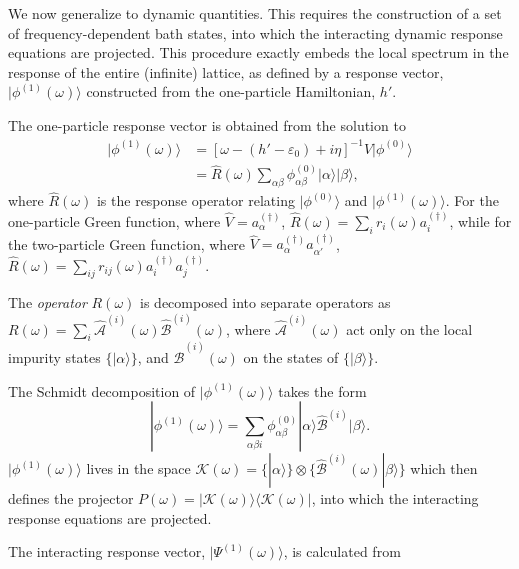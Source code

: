 \documentclass[aps,twocolumn,nobibnotes]{revtex4}
\begin{document}
We now generalize to dynamic quantities. This requires the construction of a set of frequency-dependent bath states, into which the
interacting dynamic response equations are projected. This procedure exactly embeds the local spectrum in the response of the entire (infinite) lattice, 
as defined by a response vector, $|\phi^{(1)}(\omega) \rangle$ constructed from the one-particle Hamiltonian, $h'$.
\begin{inparaenum}
\item The one-particle response vector is obtained from the solution to
\begin{align}
|\phi^{(1)}(\omega) \rangle &= \left[ \omega-(h'-\varepsilon_0)+i\eta \right]^{-1} {\hat V} |\phi^{(0)}\rangle  \nonumber \\ 
                            &= {\hat R}(\omega) \sum_{\alpha \beta} \phi^{(0)}_{\alpha \beta} |\alpha \rangle |\beta \rangle    ,
\end{align}
where ${\hat R}(\omega)$ is the response operator relating $| \phi^{(0)} \rangle$ and $| \phi^{(1)}(\omega) \rangle$. For the one-particle Green 
function, where ${\hat V} = a_{\alpha}^{(\dagger)}$, ${\hat R}(\omega) = \sum_i r_i(\omega) a_i^{(\dagger)}$, while for the two-particle Green function, 
where ${\hat V}=a_{\alpha}^{(\dagger)} a_{\alpha'}^{(\dagger)}$, ${\hat R}(\omega) = \sum_{ij} r_{ij}(\omega) a_i^{(\dagger)} a_j^{(\dagger)}$.
\item The {\em operator} $R(\omega)$ is decomposed into separate operators as $R(\omega) = \sum_i {\hat {\mathcal{A}}}^{(i)}(\omega) {\hat {\mathcal{B}}}^{(i)}(\omega)$, 
where ${\hat {\mathcal{A}}}^{(i)}(\omega)$ act only on the local impurity states $\{ |\alpha \rangle \}$, and ${\hat {\mathcal{B}}}^{(i)}(\omega)$ on the states of $\{ |\beta\rangle \}$.
\item The Schmidt decomposition of $| \phi^{(1)}(\omega) \rangle$ takes the form
\begin{equation}
|\phi^{(1)}(\omega) \rangle = \sum_{\alpha \beta i} \phi^{(0)}_{\alpha \beta} |\alpha \rangle {\hat {\mathcal{B}}}^{(i)} |\beta \rangle .
\end{equation}
$| \phi^{(1)}(\omega) \rangle$ lives in the space $\mathcal{K}(\omega) = \{ |\alpha \rangle \} \otimes \{\hat {\mathcal{B}}^{(i)}(\omega) | \beta \rangle \}$ which 
then defines the projector $P(\omega) = |\mathcal{K}(\omega)\rangle \langle \mathcal{K}(\omega) |$, into which the interacting response equations are projected.
\item The interacting response vector, $|\Psi^{(1)} (\omega) \rangle$, is calculated from

\end{inparaenum}
\end{document}
